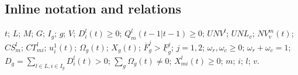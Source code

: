 \documentclass[10pt]{article}
\begin{document}
\subsection*{Inline notation and relations}
$t$; $L$; $M$; $G$; $I_g$; $g$; $V$; $D_i^l(t)\ge0$; $Q_m^l(t-1|t-1)\ge0$; $UNV^l$; $UNL_v$; $NV_v^m(t)$; $CS_m^l$; $CT_{mi}^l$; $u_i^1(t)$; $\Omega_g(t)$; $X_g(t)$; $\overline F_g^j>\underline F_g^j$; $j=1,2$; $\omega_r,\omega_c\ge0$; $\omega_r+\omega_c=1$; $D_g=\sum_{l\in L,i\in I_g}D_i^l(t)>0$; $\sum_g\Omega_g(t)\ne0$; $X_{mi}^l(t)\ge0$; $m$; $i$; $l$; $v$.
\end{document}
